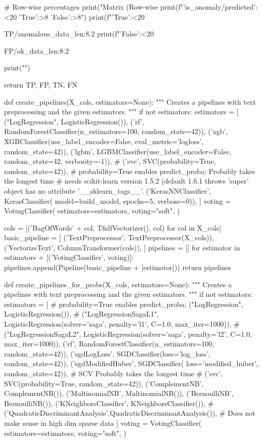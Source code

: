    # Row-wise percentages
    print("\nConfusion Matrix (Row-wise %
    print(f"{'is_anomaly/predicted':<20} {'True':>8} {'False':>8}")
    print(f"{'True':<20} {TP/anomalous_data_len:8.2%
    print(f"{'False':<20} {FP/ok_data_len:8.2%

    print("\n\n")

    return TP, FP, TN, FN


def create_pipelines(X_cols, estimators=None):
    """
    Creates a pipelines with text preprocessing and the given estimators.
    """
    if not estimators:
        estimators = [
            ("LogRegression", LogisticRegression()),
            ('rf', RandomForestClassifier(n_estimators=100, random_state=42)),
            ('xgb', XGBClassifier(use_label_encoder=False,
             eval_metric='logloss', random_state=42)),
            ('lgbm', LGBMClassifier(use_label_encoder=False,
             random_state=42, verbosity=-1)),
            # ('svc', SVC(probability=True, random_state=42)),  # probability=True enables predict_proba; Probably takes the longest time
            # needs scikit-learn version 1.5.2 (default 1.6.1 throws 'super' object has no attribute '__sklearn_tags__'.
            ('KerasNNClassifier', KerasClassifier(
                model=build_model, epochs=5, verbose=0)),
        ]
    voting = VotingClassifier(
        estimators=estimators,
        voting="soft",
    )

    cols = [('BagOfWords' + col, TfidfVectorizer(), col) for col in X_cols]
    basic_pipeline = [
        ('TextPreprocessor', TextPreprocessor(X_cols)),
        ('VectorizeText', ColumnTransformer(cols)),
    ]
    pipelines = []
    for estimator in estimators + [('VotingClassifier', voting)]:
        pipelines.append(Pipeline(basic_pipeline + [estimator]))
    return pipelines


def create_pipelines_for_probs(X_cols, estimators=None):
    """
    Creates a pipelines with text preprocessing and the given estimators.
    """
    if not estimators:
        estimators = [
            # probability=True enables predict_proba;
            ("LogRegression", LogisticRegression()),
            # ("LogRegressionSagaL1", LogisticRegression(solver='saga', penalty='l1', C=1.0, max_iter=1000)),
            # ("LogRegressionSagaL2", LogisticRegression(solver='saga', penalty='l2', C=1.0, max_iter=1000)),
            ('rf', RandomForestClassifier(n_estimators=100, random_state=42)),
            ('sgdLogLoss', SGDClassifier(loss='log_loss', random_state=42)),
            ('sgdModifiedHuber', SGDClassifier(
                loss='modified_huber', random_state=42)),
            # SCV Probably takes the longest time
            # ('svc', SVC(probability=True, random_state=42)),
            ('ComplementNB', ComplementNB()),
            ('MultinomialNB', MultinomialNB()),
            ('BernoulliNB', BernoulliNB()),
            ('KNeighborsClassifier', KNeighborsClassifier()),
            # ('QuadraticDiscriminantAnalysis',QuadraticDiscriminantAnalysis()), # Does not make sense in high dim sparse data
        ]
    voting = VotingClassifier(
        estimators=estimators,
        voting="soft",
    )

}}
